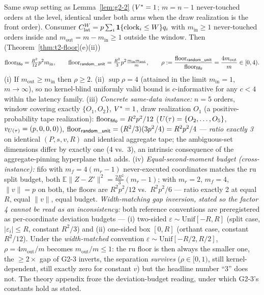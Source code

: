 \begin{lemma}
\label{lem:g2-3}
Same swap setting as Lemma~\ref{lem:g2-2} ($\Vstar = 1$; $m = n - 1$
never-touched orders at the level, identical under both arms when the draw
realization is the front order). Consumer
$\Clat[W] = p \sum_i \mathbf{1}\{\mathrm{clock}_i \le W\} q_i$ with
$m_{\mathrm{in}} \ge 1$ never-touched orders inside and
$m_{\mathrm{out}} = m - m_{\mathrm{in}} \ge 1$ outside the window. Then
(Theorem~\ref{thm:t2-floor}(e)(ii))
\[
\mathrm{floor}_{\kfifo} = \tfrac{R^2}{12} p^2 m_{\mathrm{in}},
\qquad
\mathrm{floor}_{\kru} = \tfrac{R^2}{3} p^2
\tfrac{m_{\mathrm{in}} m_{\mathrm{out}}}{m},
\qquad
\rho := \frac{\mathrm{floor}_{\kru}}{\mathrm{floor}_{\kfifo}}
= \frac{4 m_{\mathrm{out}}}{m} \in [0,4).
\]
(i) If $m_{\mathrm{out}} \ge m_{\mathrm{in}}$ then $\rho \ge 2$.
(ii) $\sup \rho = 4$ (attained in the limit $m_{\mathrm{in}} = 1$,
$m \to \infty$), so no kernel-blind uniformly valid bound is
$c$-informative for any $c < 4$ within the latency family.
(iii) \emph{Concrete same-data instance:} $n = 5$ orders, window covering
exactly $\{O_1, O_2\}$, $\Vstar = 1$, draw realization $O_1$ (a
positive-probability tape realization):
$\mathrm{floor}_{\kfifo} = R^2 p^2/12$ ($\Utau = \{O_2,\dots,O_5\}$,
$v_{\Utau} = (p,0,0,0)$), $\mathrm{floor}_{\kru} =
(R^2/3)(3p^2/4) = R^2 p^2/4$ --- \emph{ratio exactly 3} on identical
$(P,s,v,R)$ and identical aggregate tape; the ambiguous-set dimensions
differ by exactly one (4 vs.\ 3), an intrinsic consequence of the
aggregate-pinning hyperplane that  adds.
(iv) \emph{Equal-second-moment budget (cross-instance):} fifo with
$m_f = 4(m_r - 1)$ never-executed coordinates matches the ru split budget,
both $\mathbb{E}\|Z - Z'\|^2 = \tfrac{2R^2}{3}(m_r - 1)$; with $m_r = 2$,
$m_f = 4$, $\|v\| = p$ on both, the floors are $R^2 p^2/12$ vs.\
$R^2 p^2/6$ --- ratio exactly 2 at equal $R$, equal $\|v\|$, equal budget.
\emph{Width-matching gap inversion, stated so the factor 4 cannot be read as
an inconsistency:} both reference conventions are preregistered as
per-coordinate deviation budgets --- (i) two-sided
$\varepsilon \sim \mathrm{Unif}[-R,R]$ (split case, $|\varepsilon_i| \le R$,
constant $R^2/3$) and (ii) one-sided box $[0,R]$ (orthant case, constant
$R^2/12$). Under the \emph{width-matched} convention
$\varepsilon \sim \mathrm{Unif}[-R/2, R/2]$, $\rho = 4 m_{\mathrm{out}}/m$
becomes $m_{\mathrm{out}}/m \le 1$: the ru floor is then always the smaller
one, the $\ge 2\times$ gap of G2-3 inverts, the separation
\emph{survives} ($\rho \in [0,1)$, still kernel-dependent, still exactly
zero for constant $v$) but the headline number ``3'' does not. The theory
appendix froze the deviation-budget reading, under which G2-3's constants
hold as stated.
\end{lemma}

